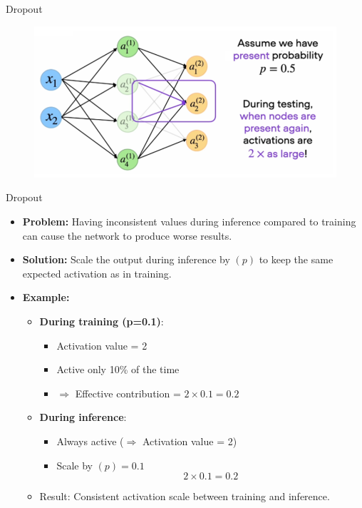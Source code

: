\begin{frame}{Dropout}
\begin{figure}
    \centering
    \includegraphics[width=1.0\textwidth,height=1.0\textheight,keepaspectratio]{images/dropout_light.png}
    \end{figure}
\end{frame}

\begin{frame}{Dropout}
\begin{itemize}
    \item \textbf{Problem:} Having inconsistent values during inference compared to training can cause the network to produce worse results.
    \item \textbf{Solution:} Scale the output during inference by $(p)$ to keep the same expected activation as in training.
    \item \textbf{Example:}
    \begin{itemize}
  \item \textbf{During training (p=0.1)}: 
    \begin{itemize}
      \item Activation value = 2
      \item Active only 10\% of the time 
      \item $\Rightarrow$ Effective contribution = $2 \times 0.1 = 0.2$
    \end{itemize}
  \item \textbf{During inference}: 
    \begin{itemize}
      \item Always active ($\Rightarrow$ Activation value = 2)
      \item Scale by $(p) = 0.1$
      \[
        2 \times 0.1 = 0.2
      \]
    \end{itemize}
  \item Result: Consistent activation scale between training and inference.
\end{itemize}
\end{itemize}
\end{frame}

